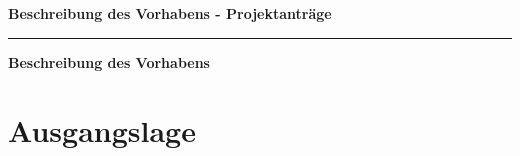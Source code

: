 \documentclass[ngerman]{scrartcl}
\newcommand{\applicants}{[Name, Vorname, Ort aller Antragsteller:innen]}
\newcommand{\project}{[Titel des Projekts]}
\begin{document}
\pagestyle{empty}
\setcounter{page}{1}

%

\cleardoublepage
\pagestyle{plain}


{\raggedright{} \normalsize \bfseries 
	Beschreibung des Vorhabens - Projektanträge \newline \par
	\applicants{} \newline \par
	\project{} \par
	\rule{\textwidth}{0.5pt} \par
}


\textbf{Beschreibung des Vorhabens}
\section{Ausgangslage}
\label{sec:work-report}
\end{document}
